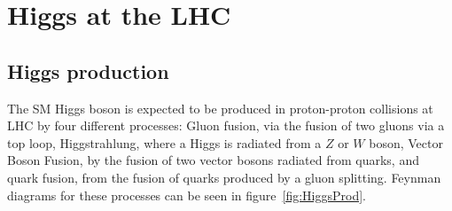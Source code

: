 \section{Higgs at the LHC}
\subsection{Higgs production}

The SM Higgs boson is expected to be produced in proton-proton collisions at LHC by four different processes: Gluon fusion, via the fusion of two gluons via a top loop, Higgstrahlung, where a Higgs is radiated from a $Z$ or $W$ boson, Vector Boson Fusion, by the fusion of two vector bosons radiated from quarks, and quark fusion, from the fusion of quarks produced by a gluon splitting. Feynman diagrams for these processes can be seen in figure~\ref{fig:HiggsProd}. 

